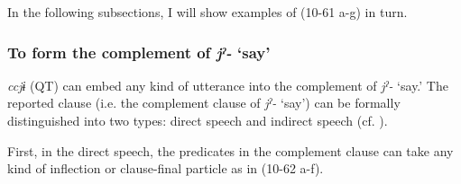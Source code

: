 In the following subsections, I will show examples of (10-61 a-g) in turn.

\subsubsection{To form the complement of \textit{jˀ-} ‘say’}\label{sec:10.4.1.1}

\textit{ccjɨ} (QT) can embed any kind of utterance into the complement of \textit{jˀ-} ‘say.’ The reported clause (i.e. the complement clause of \textit{jˀ-} ‘say’) can be formally distinguished into two types: direct speech and indirect speech (cf. \citealt{Aikhenvald2004}).

First, in the direct speech, the predicates in the complement clause can take any kind of inflection or clause-final particle as in (10-62 a-f).

